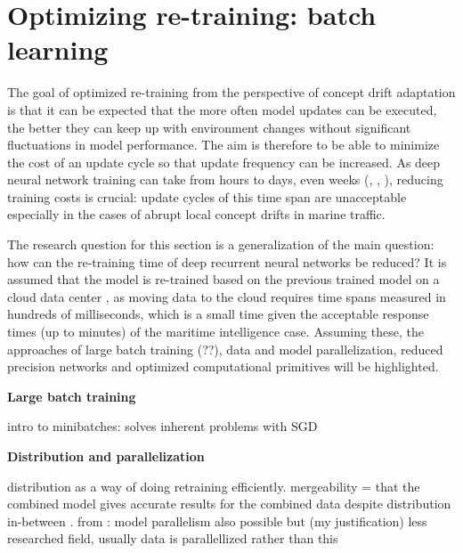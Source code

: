\section{Optimizing re-training: batch learning}



The goal of optimized re-training from the perspective of concept drift adaptation is that it can be expected that the more often model updates can be executed, the better they can keep up with environment changes without significant fluctuations in model performance. The aim is therefore to be able to minimize the cost of an update cycle so that update frequency can be increased. As deep neural network training can take from hours to days, even weeks (\cite{szeEfficientProcessingDeep2017}, \cite{jia_highly_2018}, \cite{de_sa_high-accuracy_2018}), reducing training costs is crucial: update cycles of this time span are unacceptable especially in the cases of abrupt local concept drifts in marine traffic.

The research question for this section is a generalization of the main question: how can the re-training time of deep recurrent neural networks be reduced? It is assumed that the model is re-trained based on the previous trained model  on a cloud data center , as moving data to the cloud requires time spans measured in hundreds of milliseconds, which is a small time given the acceptable response times (up to minutes) of the maritime intelligence case. Assuming these, the approaches of large batch training (??), data and model parallelization, reduced precision networks and optimized computational primitives will be highlighted.

\textbf{Large batch training}

intro to minibatches: solves inherent problems with SGD

\textbf{Distribution and parallelization}

distribution as a way of doing retraining efficiently. mergeability =  that the combined model gives accurate results for the combined data despite distribution in-between \cite{bifetMachineLearningData2017}. from \cite{ben-nunDemystifyingParallelDistributed2019}: model parallelism also possible but (my justification) less researched field, usually data is parallellized rather than this


